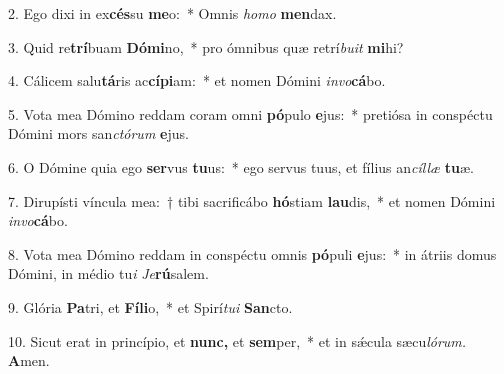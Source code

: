 \item 2. Ego dixi in ex\textbf{cés}su \textbf{me}o:~* Omnis \textit{ho}\textit{mo} \textbf{men}dax.
\item 3. Quid re\textbf{trí}buam \textbf{Dó}\textbf{mi}no,~* pro ómnibus quæ retrí\textit{bu}\textit{it} \textbf{mi}hi?
\item 4. Cálicem salu\textbf{tá}ris ac\textbf{cí}\textbf{pi}am:~* et nomen Dómini \textit{in}\textit{vo}\textbf{cá}bo.
\item 5. Vota mea Dómino reddam coram omni \textbf{pó}pulo \textbf{e}jus:~* pretiósa in conspé\-ctu Dómini mors san\textit{ctó}\textit{rum} \textbf{e}jus.
\item 6. O Dómine quia ego \textbf{ser}vus \textbf{tu}us:~* ego servus tuus, et fílius an\textit{cíl}\textit{læ} \textbf{tu}æ.
\item 7. Dirupísti víncula mea:~† tibi sacrificábo \textbf{hó}stiam \textbf{lau}dis,~* et nomen Dómini \textit{in}\textit{vo}\textbf{cá}bo.
\item 8. Vota mea Dómino reddam in conspéctu omnis \textbf{pó}puli \textbf{e}jus:~* in átriis domus Dómini, in médio tu\textit{i} \textit{Je}\textbf{rú}salem.
\item 9. Glória \textbf{Pa}tri, et \textbf{Fí}\textbf{li}o,~* et Spirí\hspace{0.03em}\textit{tui} \textbf{San}cto.
\item 10. Sicut erat in princípio, et \textbf{nunc,} et \textbf{sem}per,~* et in sǽcula sæcu\textit{lórum.} \textbf{A}men.